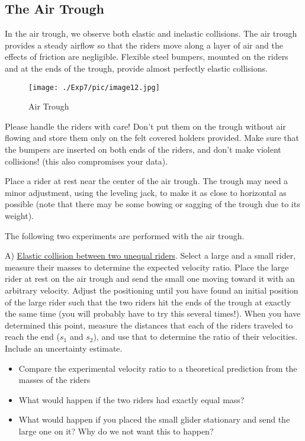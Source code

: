 \subsection{The Air Trough}
In the air trough, we observe both elastic and inelastic collisions. The air trough provides a steady airflow so that the riders move along a layer of air and the effects of friction are negligible. Flexible steel bumpers, mounted on the riders and at the ends of the trough, provide almost perfectly elastic collisions.\myskip
\begin{figure}[h]
\centering
\texttt{[image: ./Exp7/pic/image12.jpg]}
\caption{Air Trough}
\end{figure} 

Please handle the riders with care! Don’t put them on the trough without air flowing and store them only on the felt covered holders provided. Make sure that the bumpers are inserted on both ends of the riders, and don't make violent collisions! (this also compromises your data).\myskip

Place a rider at rest near the center of the air trough. The trough may need a minor adjustment, using the leveling jack, to make it as close to horizontal as possible (note that there may be some bowing or sagging of the trough due to its weight).\myskip

The following two experiments are performed with the air trough.\myskip

A) \underline{Elastic collision between two unequal riders}. Select a large and a small rider, measure their masses to determine the expected velocity ratio. Place the large rider at rest on the air trough and send the small one moving toward it with an arbitrary velocity. Adjust the positioning until you have found an initial position of the large rider such that the two riders hit the ends of the trough at exactly the same time (you will probably have to try this several times!). When you have determined this point, measure the distances that each of the riders traveled to reach the end ($s_{1}$ and $s_{2}$), and use that to determine the ratio of their velocities. Include an uncertainty estimate.
\begin{itemize}
\item Compare the experimental velocity ratio to a theoretical prediction from the masses of the riders
\item What would happen if the two riders had exactly equal mass?
\item What would happen if you placed the small glider stationary and send the large one on it? Why do we not want this to happen?
\end{itemize}


